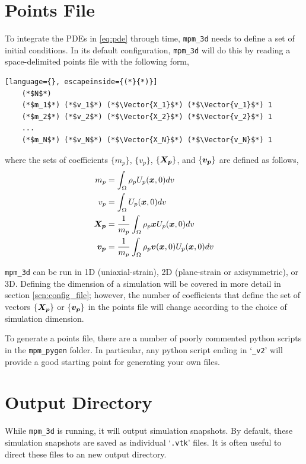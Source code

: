 \section{Points File}
To integrate the PDEs in \eqref{eq:pde} through time, \texttt{mpm\_3d} needs to define a set of initial conditions. In its default configuration, \texttt{mpm\_3d} will do this by reading a space-delimited points file with the following form,
\begin{lstlisting}[language={}, escapeinside={(*}{*)}]
    (*$N$*)
    (*$m_1$*) (*$v_1$*) (*$\Vector{X_1}$*) (*$\Vector{v_1}$*) 1
    (*$m_2$*) (*$v_2$*) (*$\Vector{X_2}$*) (*$\Vector{v_2}$*) 1
    ...
    (*$m_N$*) (*$v_N$*) (*$\Vector{X_N}$*) (*$\Vector{v_N}$*) 1
\end{lstlisting}
where the sets of coefficients \(\{m_p\}\), \(\{v_p\}\), \(\{\boldsymbol{X_p}\}\), and \(\{\boldsymbol{v_p}\}\) are defined as follows,
\[
\begin{aligned}
m_p &= \int_{\Omega}{\rho_p U_p(\boldsymbol{x},0) dv}
\\v_p &= \int_{\Omega}{U_p(\boldsymbol{x},0) dv}
\\\boldsymbol{X_p} &= \frac{1}{m_p}\int_{\Omega}{\rho_p \boldsymbol{x} U_p(\boldsymbol{x},0) dv}
\\\boldsymbol{v_p} &= \frac{1}{m_p}\int_{\Omega}{\rho_p \boldsymbol{v}(\boldsymbol{x},0) U_p(\boldsymbol{x},0) dv}
\end{aligned}
\]

\texttt{mpm\_3d} can be run in 1D (uniaxial-strain), 2D (plane-strain or axisymmetric), or 3D. Defining the dimension of a simulation will be covered in more detail in section \ref{scn:config_file}; however, the number of coefficients that define the set of vectors \(\{\boldsymbol{X_p}\}\) or \(\{\boldsymbol{v_p}\}\) in the points file will change according to the choice of simulation dimension.

To generate a points file, there are a number of poorly commented python scripts in the \texttt{mpm\_pygen} folder. In particular, any python script ending in `\texttt{\_v2}' will provide a good starting point for generating your own files.


\section{Output Directory}
While \texttt{mpm\_3d} is running, it will output simulation snapshots. By default, these simulation snapshots are saved as individual `\texttt{.vtk}' files. It is often useful to direct these files to an new output directory.

